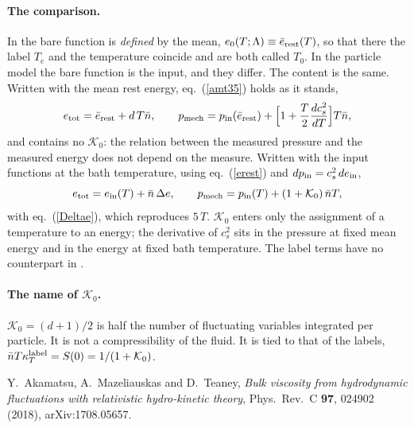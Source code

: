 \documentclass[11pt,aps,preprint,nofootinbib,superscriptaddress,tightenlines]{revtex4-2}
\def\st{\begin{equation}}
\def\stp{\end{equation}}
\def\Eq#1{eq.~(\ref{#1})}
\let\oldparagraph\paragraph
\renewcommand{\paragraph}{\par\bigskip\oldparagraph}
\begin{document}
\paragraph{The comparison.}  In \cite{amt} the bare function is \emph{defined} by the mean, $e_0(T;\Lambda)\equiv\bar e_{\rm rest}(T)$, so that there the label $T_e$ and the
temperature coincide and are both called $T_0$.  In the particle model the bare function is the input, and they differ.  The content is the
same.  Written with the mean rest energy, \Eq{amt35} holds as it stands,
\st
e_{\rm tot}=\bar e_{\rm rest}+d\,T\bar n,\qquad p_{\rm mech}=p_{\rm in}(\bar e_{\rm rest})+\Big[1+\frac T2\frac{dc_s^2}{dT}\Big]T\bar n ,
\stp
and contains no $\mathcal K_0$: the relation between the measured pressure and the measured energy does not depend on the measure.  Written with
the input functions at the bath temperature, using \Eq{erest} and $dp_{\rm in}=c_s^2\,de_{\rm in}$,
\st
e_{\rm tot}=e_{\rm in}(T)+\bar n\,\Delta e,\qquad p_{\rm mech}=p_{\rm in}(T)+(1+\mathcal K_0)\,\bar nT ,
\stp
with \Eq{Deltae}, which reproduces $5\,T$.  $\mathcal K_0$ enters only the assignment of a temperature to an energy; the derivative of $c_s^2$ sits in the
pressure at fixed mean energy and in the energy at fixed bath temperature.  The label terms have no counterpart in \cite{amt}.

\paragraph{The name of $\mathcal K_0$.}  $\mathcal K_0=(d+1)/2$ is half the number of fluctuating variables integrated per particle.  It is not a compressibility of the
fluid.  It is tied to that of the labels, $\bar nT\kappa_T^{\rm label}=S(0)=1/(1+\mathcal K_0)$.

\begin{thebibliography}{9}
 Y.~Akamatsu, A.~Mazeliauskas and D.~Teaney, \emph{Bulk viscosity from hydrodynamic fluctuations with relativistic hydro-kinetic theory},
  Phys.\ Rev.\ C \textbf{97}, 024902 (2018), arXiv:1708.05657.
\end{thebibliography}
\end{document}

